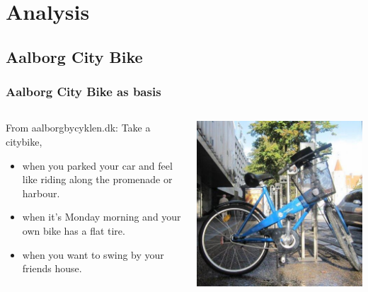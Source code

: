 \section{Analysis}

\subsection{Aalborg City Bike}

\begin{frame}
\frametitle{Aalborg City Bike as basis}

\begin{columns}

  \begin{column}{.45\textwidth}
  
    \begin{block}{From aalborgbycyklen.dk:}
    Take a citybike,
    \begin{itemize}
    \item when you parked your car and feel like riding along the promenade or harbour.
    \item when it's Monday morning and your own bike has a flat tire.
    \item when you want to swing by your friends house.
    \end{itemize}
    \end{block}
  
  \end{column}
  
  \begin{column}{.45\textwidth}
  \includegraphics[width=\textwidth]{graphics/acb_bike}
  \end{column}

\end{columns}

\end{frame}

